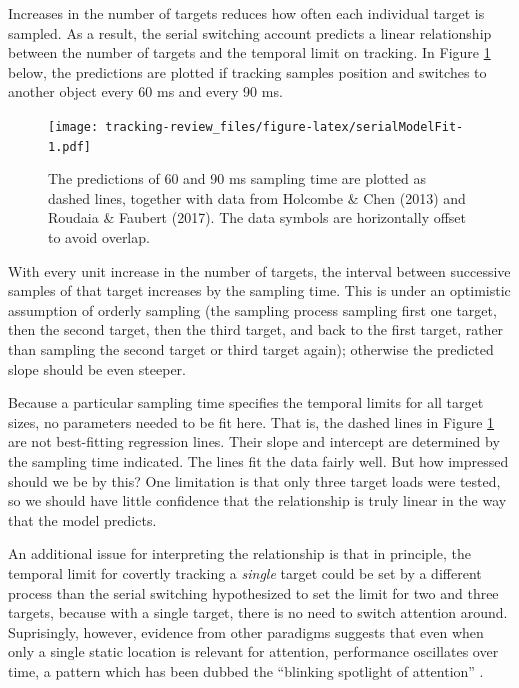 \documentclass[
]{book}
\begin{document}
Increases in the number of targets reduces how often each individual target is sampled. As a result, the serial switching account predicts a linear relationship between the number of targets and the temporal limit on tracking. In Figure \ref{fig:serialModelFit} below, the predictions are plotted if tracking samples position and switches to another object every 60 ms and every 90 ms.

\begin{figure}
\centering
\texttt{[image: tracking-review\_files/figure-latex/serialModelFit-1.pdf]}
\caption{\label{fig:serialModelFit}The predictions of 60 and 90 ms sampling time are plotted as dashed lines, together with data from Holcombe \& Chen (2013) and Roudaia \& Faubert (2017). The data symbols are horizontally offset to avoid overlap.}
\end{figure}

With every unit increase in the number of targets, the interval between successive samples of that target increases by the sampling time. This is under an optimistic assumption of orderly sampling (the sampling process sampling first one target, then the second target, then the third target, and back to the first target, rather than sampling the second target or third target again); otherwise the predicted slope should be even steeper.

Because a particular sampling time specifies the temporal limits for all target sizes, no parameters needed to be fit here. That is, the dashed lines in Figure \ref{fig:serialModelFit} are not best-fitting regression lines. Their slope and intercept are determined by the sampling time indicated. The lines fit the data fairly well. But how impressed should we be by this? One limitation is that only three target loads were tested, so we should have little confidence that the relationship is truly linear in the way that the model predicts.

An additional issue for interpreting the relationship is that in principle, the temporal limit for covertly tracking a \emph{single} target could be set by a different process than the serial switching hypothesized to set the limit for two and three targets, because with a single target, there is no need to switch attention around. Suprisingly, however, evidence from other paradigms suggests that even when only a single static location is relevant for attention, performance oscillates over time, a pattern which has been dubbed the ``blinking spotlight of attention'' \citep{vanrullenBlinkingSpotlightAttention2007, fiebelkornReportRhythmicSampling2013}.
\end{document}

